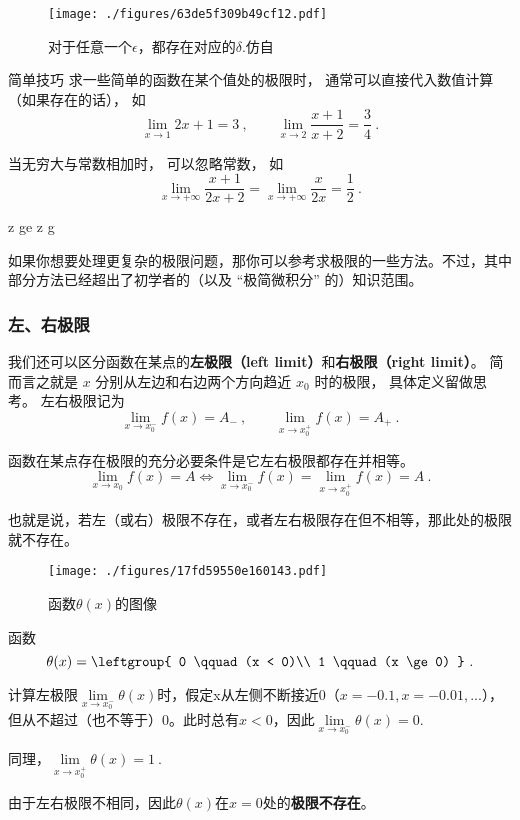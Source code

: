 \begin{figure}[ht]
\centering
\texttt{[image: ./figures/63de5f309b49cf12.pdf]}
\caption{对于任意一个$\epsilon$，都存在对应的$\delta$.仿自\cite{Thomas}} \label{fig_FunLim_8}
\end{figure}

\begin{example}{简单技巧}
求一些简单的函数在某个值处的极限时， 通常可以直接代入数值计算（如果存在的话）， 如
\begin{equation}
\lim_{x\to 1} 2x + 1 = 3 ~,\qquad \lim_{x\to 2}\frac{x + 1}{x + 2} = \frac34~.
\end{equation}

当无穷大与常数相加时， 可以忽略常数， 如
\begin{equation}
\lim_{x\to +\infty} \frac{x + 1}{2x + 2} = \lim_{x\to +\infty} \frac{x}{2x} = \frac12~.
\end{equation}

z ge z g

如果你想要处理更复杂的极限问题，那你可以参考求极限的一些方法。不过，其中部分方法已经超出了初学者的（以及 “极简微积分” 的）知识范围。
\end{example}

\subsubsection{左、右极限}
我们还可以区分函数在某点的\textbf{左极限（left limit）}和\textbf{右极限（right limit）}。 简而言之就是 $x$ 分别从左边和右边两个方向趋近 $x_0$ 时的极限， 具体定义留做思考。 左右极限记为
\begin{equation}
\lim_{x\to x_0^-} f(x) = A_- ~,\qquad \lim_{x\to x_0^+} f(x) = A_+~.
\end{equation}

\begin{theorem}{}
函数在某点存在极限的充分必要条件是它左右极限都存在并相等。
$$\lim_{x\to x_0} f(x) = A \Leftrightarrow \lim_{x\to x_0^-} f(x) = \lim_{x\to x_0^+} f(x) = A ~.$$

也就是说，若左（或右）极限不存在，或者左右极限存在但不相等，那此处的极限就不存在。
\end{theorem}

\begin{example}{}
\begin{figure}[ht]
\centering
\texttt{[image: ./figures/17fd59550e160143.pdf]}
\caption{函数$\theta(x)$的图像} \label{fig_FunLim_3}
\end{figure}
函数
\begin{equation}
\theta(x) = \leftgroup{
0 \qquad (x < 0)\\
1 \qquad (x \ge 0)
}~.\end{equation}

计算左极限$\lim\limits_{x\to x_0^-} \theta(x)$时，假定x从左侧不断接近$0$（$x=-0.1,x=-0.01,...$）， 但从不超过（也不等于）$0$。此时总有$x<0$，因此$\lim\limits_{x\to x_0^-} \theta(x) = 0$. 

同理，$\lim\limits_{x\to x_0^+} \theta(x) = 1~.$

由于左右极限不相同，因此$\theta(x)$在$x=0$处的\textbf{极限不存在}。
\end{example}

